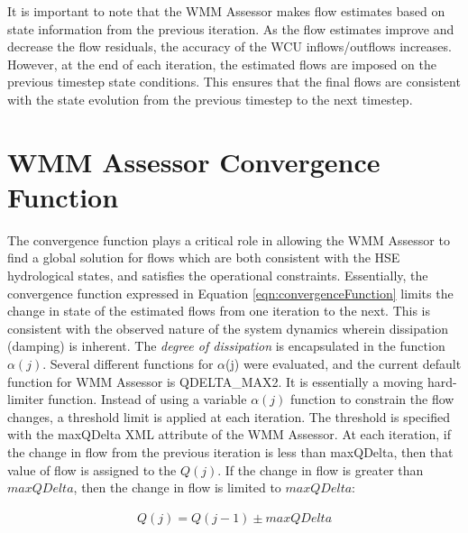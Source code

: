 It is important to note that the WMM Assessor makes flow estimates
based on state information from the previous iteration. As the flow
estimates improve and decrease the flow residuals, the accuracy of the
WCU inflows/outflows increases. However, at the end of each iteration,
the estimated flows are imposed on the previous timestep state
conditions. This ensures that the final flows are consistent with the
state evolution from the previous timestep to the next timestep.

\section {WMM Assessor Convergence Function}
The convergence function plays a critical role in allowing the WMM
Assessor to find a global solution for flows which are both consistent
with the HSE hydrological states, and satisfies the operational
constraints. Essentially, the convergence function expressed in
Equation \ref{eqn:convergenceFunction} limits the change in state of
the estimated flows from one iteration to the next. This is consistent
with the observed nature of the system dynamics wherein dissipation
(damping) is inherent. The \emph {degree of dissipation} is
encapsulated in the function $\alpha(j)$. Several different functions
for $\alpha$(j) were evaluated, and the current default function for
WMM Assessor is QDELTA\_MAX2.  It is essentially a moving hard-limiter
function. Instead of using a variable $\alpha (j)$ function to
constrain the flow changes, a threshold limit is applied at each
iteration. The threshold is specified with the maxQDelta XML attribute
of the WMM Assessor. At each iteration, if the change in flow from the
previous iteration is less than maxQDelta, then that value of flow is
assigned to the $Q(j)$. If the change in flow is greater than
$maxQDelta$, then the change in flow is limited to $maxQDelta$:

\begin{align}
  Q(j) = Q(j-1) \pm maxQDelta
\end{align}

